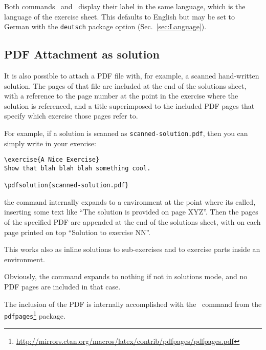 \documentclass[11pt,a4paper]{article}
\begin{document}

\begin{pkgnotice}
  Both commands~ and~ display their label in the same
  language, which is the language of the exercise sheet. This defaults to English but may
  be set to German with the {\tt deutsch} package option (Sec.~\ref{sec:Language}).
\end{pkgnotice}


\subsection{PDF Attachment as solution}

It is also possible to attach a PDF file with, for example, a scanned hand-written
solution. The pages of that file are included at the end of the solutions sheet, with a
reference to the page number at the point in the exercise where the solution is
referenced, and a title superimposed to the included PDF pages that specify which exercise
those pages refer to.

For example, if a solution is scanned as \texttt{scanned-solution.pdf}, then you can
simply write in your exercise:
\begin{pkgverbatim}
\begin{verbatim}
\exercise{A Nice Exercise}
Show that blah blah blah something cool.

\pdfsolution{scanned-solution.pdf}

\end{verbatim}
\end{pkgverbatim}

the  command internally expands to a  environment
at the point where its called, inserting some text like ``The solution is provided on page
XYZ''. Then the pages of the specified PDF are appended at the end of the solutions sheet,
with on each page printed on top ``Solution to exercise NN''.

This works also as inline solutions to sub-exercises and to exercise parts inside an
 environment.

Obviously, the command expands to nothing if not in solutions mode, and no PDF pages are
included in that case.

The inclusion of the PDF is internally accomplished with the~ command
from the
\texttt{pdfpages}\footnote{\url{http://mirrors.ctan.org/macros/latex/contrib/pdfpages/pdfpages.pdf}}
package.
\end{document}
